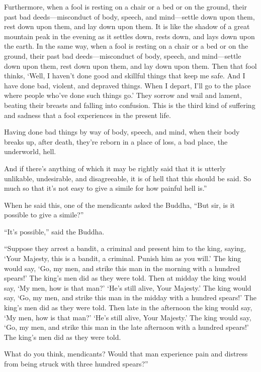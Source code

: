 \documentclass[12pt,openany]{book}%
\begin{document}
Furthermore, when a fool is resting on a chair or a bed or on the ground, their past bad deeds—misconduct of body, speech, and mind—settle down upon them, rest down upon them, and lay down upon them. It is like the shadow of a great mountain peak in the evening as it settles down, rests down, and lays down upon the earth. In the same way, when a fool is resting on a chair or a bed or on the ground, their past bad deeds—misconduct of body, speech, and mind—settle down upon them, rest down upon them, and lay down upon them. Then that fool thinks, ‘Well, I haven’t done good and skillful things that keep me safe. And I have done bad, violent, and depraved things. When I depart, I’ll go to the place where people who’ve done such things go.’ They sorrow and wail and lament, beating their breasts and falling into confusion. This is the third kind of suffering and sadness that a fool experiences in the present life. 

Having done bad things by way of body, speech, and mind, when their body breaks up, after death, they’re reborn in a place of loss, a bad place, the underworld, hell. 

And if there’s anything of which it may be rightly said that it is utterly unlikable, undesirable, and disagreeable, it is of hell that this should be said. So much so that it’s not easy to give a simile for how painful hell is.” 

When he said this, one of the mendicants asked the Buddha, “But sir, is it possible to give a simile?” 

“It’s possible,” said the Buddha. 

“Suppose they arrest a bandit, a criminal and present him to the king, saying, ‘Your Majesty, this is a bandit, a criminal. Punish him as you will.’ The king would say, ‘Go, my men, and strike this man in the morning with a hundred spears!’ The king’s men did as they were told. Then at midday the king would say, ‘My men, how is that man?’ ‘He’s still alive, Your Majesty.’ The king would say, ‘Go, my men, and strike this man in the midday with a hundred spears!’ The king’s men did as they were told. Then late in the afternoon the king would say, ‘My men, how is that man?’ ‘He’s still alive, Your Majesty.’ The king would say, ‘Go, my men, and strike this man in the late afternoon with a hundred spears!’ The king’s men did as they were told. 

What do you think, mendicants? Would that man experience pain and distress from being struck with three hundred spears?” 
\end{document}
